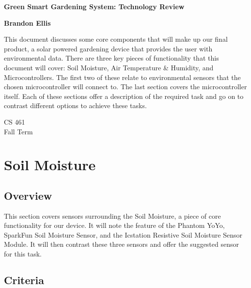 \documentclass[IEEEtran,letterpaper,10pt,titlepage,fleqn,draftclsnofoot,onecolumn]{article}
\begin{document}
\begin{titlepage}
	\begin{center}
		\vspace*{1cm}
		
		\huge
		\textbf{Green Smart Gardening System: Technology Review}
        
        \vspace{1.5cm}
        
		\large
        \textbf{Brandon Ellis}
		
		\vspace{5cm}
		
		\normalsize
		This document discusses some core components that will make up our final product, a solar powered gardening device that provides the user with environmental data. There are three key pieces of functionality that this document will cover: Soil Moisture, Air Temperature \& Humidity, and Microcontrollers. The first two of these relate to environmental sensors that the chosen microcontroller will connect to. The last section covers the microcontroller itself. Each of these sections offer a description of the required task and go on to contrast different options to achieve these tasks.
		
		\vfill
        
		\large
        CS 461\\
        Fall Term\\
    \end{center}
\end{titlepage}

\section{Soil Moisture}
\subsection{Overview}

This section covers sensors surrounding the Soil Moisture, a piece of core functionality for our device. It will note the feature of the Phantom YoYo, SparkFun Soil Moisture Sensor, and the Icstation Resistive Soil Moisture Sensor Module. It will then contrast these three sensors and offer the suggested sensor for this task.

\subsection{Criteria}
\end{document}
